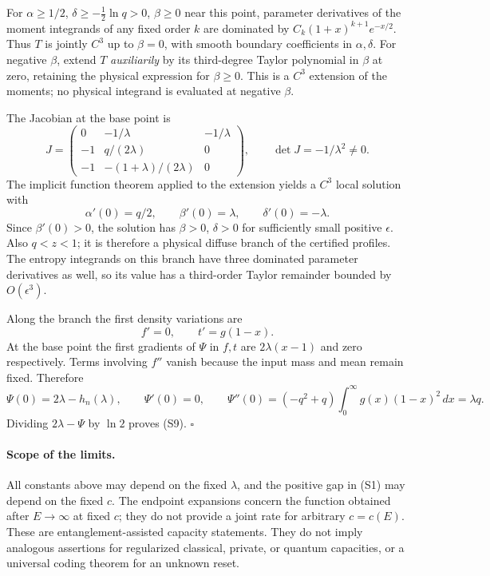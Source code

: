 \documentclass[11pt]{article}
\begin{document}
For \(\alpha\ge1/2\), \(\delta\ge-\tfrac12\ln q>0\), \(\beta\ge0\)
near this point, parameter derivatives of the moment integrands
of any fixed order \(k\) are dominated by
\(C_k(1+x)^{k+1}e^{-x/2}\).
Thus \(T\) is jointly \(C^3\) up to \(\beta=0\), with smooth
boundary coefficients in \(\alpha,\delta\).
For negative \(\beta\), extend \(T\) \emph{auxiliarily} by its
third-degree Taylor polynomial in \(\beta\) at zero, retaining
the physical expression for \(\beta\ge0\).
This is a \(C^3\) extension of the moments; no physical integrand
is evaluated at negative \(\beta\).

The Jacobian at the base point is
\[
 J=\begin{pmatrix}
 0&-1/\lambda&-1/\lambda\\
 -1&q/(2\lambda)&0\\
 -1&-(1+\lambda)/(2\lambda)&0
 \end{pmatrix},
 \qquad \det J=-1/\lambda^2\ne0.
\]
The implicit function theorem applied to the extension yields a
\(C^3\) local solution with
\[
 \alpha'(0)=q/2,\qquad\beta'(0)=\lambda,\qquad
 \delta'(0)=-\lambda .
\]
Since \(\beta'(0)>0\), the solution has \(\beta>0\), \(\delta>0\)
for sufficiently small positive \(\epsilon\). Also \(q<z<1\);
it is therefore a physical diffuse branch of the certified profiles.
The entropy integrands on this branch have three dominated
parameter derivatives as well, so its value has a third-order
Taylor remainder bounded by \(O(\epsilon^3)\).

Along the branch the first density variations are
\[
 f'=0,\qquad t'=g(1-x).
\]
At the base point the first gradients of \(\Psi\) in \(f,t\)
are \(2\lambda(x-1)\) and zero respectively.
Terms involving \(f''\) vanish because the input mass and mean
remain fixed. Therefore
\[
 \Psi(0)=2\lambda-h_n(\lambda),\qquad
 \Psi'(0)=0,\qquad
 \Psi''(0)=(-q^2+q)\int_0^\infty g(x)(1-x)^2\,dx=\lambda q.
\]
Dividing \(2\lambda-\Psi\) by \(\ln2\) proves (S9). \(\square\)

\paragraph{Scope of the limits.}
All constants above may depend on the fixed \(\lambda\), and the
positive gap in (S1) may depend on the fixed \(c\).
The endpoint expansions concern the function obtained after
\(E\to\infty\) at fixed \(c\); they do not provide a joint rate for
arbitrary \(c=c(E)\). These are entanglement-assisted capacity
statements. They do not imply analogous assertions for regularized
classical, private, or quantum capacities, or a universal coding
theorem for an unknown reset.
\end{document}
